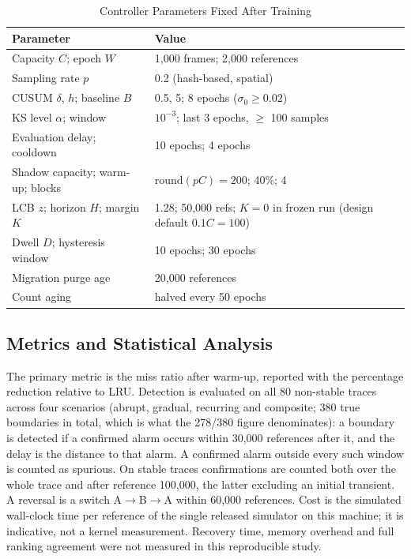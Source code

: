 \documentclass[10pt,twocolumn,a4paper]{IEEEtran}
\begin{document}
\begin{table}[!t]
\caption{Controller Parameters Fixed After Training}
\label{tab:params}
\footnotesize
\begin{tabular}{@{}p{}p{}@{}}
\toprule
Parameter & Value \\
\midrule
Capacity $C$; epoch $W$ & 1,000 frames; 2,000 references \\
Sampling rate $p$ & 0.2 (hash-based, spatial) \\
CUSUM $\delta$, $h$; baseline $B$ & 0.5, 5; 8 epochs ($\sigma_0 \ge 0.02$) \\
KS level $\alpha$; window & $10^{-3}$; last 3 epochs, $\ge$ 100 samples \\
Evaluation delay; cooldown & 10 epochs; 4 epochs \\
Shadow capacity; warm-up; blocks & $\mathrm{round}(pC) = 200$; 40\%; 4 \\
LCB $z$; horizon $H$; margin $K$ & 1.28; 50,000 refs; $K = 0$ in frozen run (design default $0.1C = 100$) \\
Dwell $D$; hysteresis window & 10 epochs; 30 epochs \\
Migration purge age & 20,000 references \\
Count aging & halved every 50 epochs \\
\bottomrule
\end{tabular}
\end{table}

\subsection{Metrics and Statistical Analysis}

The primary metric is the miss ratio after warm-up, reported with the
percentage reduction relative to LRU. Detection is evaluated on all 80
non-stable traces across four scenarios (abrupt, gradual, recurring and
composite; 380 true boundaries in total, which is what the 278/380 figure
denominates): a boundary is detected if a confirmed alarm occurs within
30,000 references after it, and the delay is the distance to that alarm. A
confirmed alarm outside every such window is counted as spurious. On stable
traces confirmations are counted both over the whole trace and after reference
100,000, the latter excluding an initial transient. A reversal is a switch
A$\to$B$\to$A within 60,000 references. Cost is the simulated wall-clock time per reference of the single
released simulator on this machine; it is indicative, not a kernel measurement.
Recovery time, memory overhead and full ranking agreement were not measured in
this reproducible study.
\end{document}
